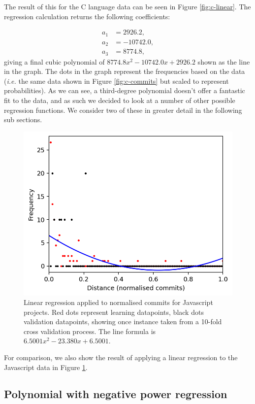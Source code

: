 \documentclass[pdflatex, sn-mathphys, referee]{sn-jnl}%
\theoremstyle{thmstyleone}%
\theoremstyle{thmstyletwo}%
\theoremstyle{thmstylethree}%
\def\ie{{\it i.e.}}
\theoremstyle{thmstyleone}
\begin{document}
The result of this for the C language data can be seen in Figure \ref{fig:c-linear}. The regression calculation returns the following coefficients:

\begin{align*}
a_1 & = 2926.2, \\
a_2 & = -10742.0, \\
a_3 & = 8774.8,
\end{align*}
giving a final cubic polynomial of $8774.8 x^{2} - 10742.0 x + 2926.2$ shown as the line in the graph. The dots in the graph represent the frequencies based on the data (\ie\/ the same data shown in Figure \ref{fig:c-commits} but scaled to represent probabilities). As we can see, a third-degree polynomial doesn't offer a fantastic fit to the data, and as such we decided to look at a number of other possible regression functions. We consider two of these in greater detail in the following sub sections.

\begin{figure}[t]
\centering
\includegraphics[width=0.7\columnwidth]{Fig14}%
\caption{\label{fig:javascript-linear}Linear regression applied to normalised commits for Javascript projects. Red dots represent learning datapoints, black dots validation datapoints, showing once instance taken from a 10-fold cross validation process. The line formula is $6.5001 x^{2} -23.380 x + 6.5001$.}
\end{figure}

For comparison, we also show the result of applying a linear regression to the Javascript data in Figure \ref{fig:javascript-linear}.

\subsection{Polynomial with negative power regression}
\end{document}

